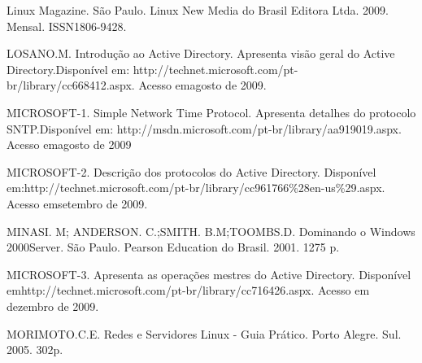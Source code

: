 Linux Magazine. São Paulo. Linux New Media do Brasil Editora Ltda. 2009. Mensal. ISSN1806-9428.

LOSANO.M. Introdução ao Active Directory. Apresenta visão geral do Active Directory.Disponível em: http://technet.microsoft.com/pt-br/library/cc668412.aspx. Acesso emagosto de 2009.

MICROSOFT-1. Simple Network Time Protocol. Apresenta detalhes do protocolo SNTP.Disponível em: http://msdn.microsoft.com/pt-br/library/aa919019.aspx. Acesso emagosto de 2009

MICROSOFT-2. Descrição dos protocolos do Active Directory. Disponível em:http://technet.microsoft.com/pt-br/library/cc961766\%28en-us\%29.aspx. Acesso emsetembro de 2009.

MINASI. M; ANDERSON. C.;SMITH. B.M;TOOMBS.D. Dominando o Windows 2000Server. São Paulo. Pearson Education do Brasil. 2001. 1275 p.

MICROSOFT-3. Apresenta as operações mestres do Active Directory. Disponível emhttp://technet.microsoft.com/pt-br/library/cc716426.aspx. Acesso em dezembro de 2009.

MORIMOTO.C.E. Redes e Servidores Linux - Guia Prático. Porto Alegre. Sul. 2005. 302p.